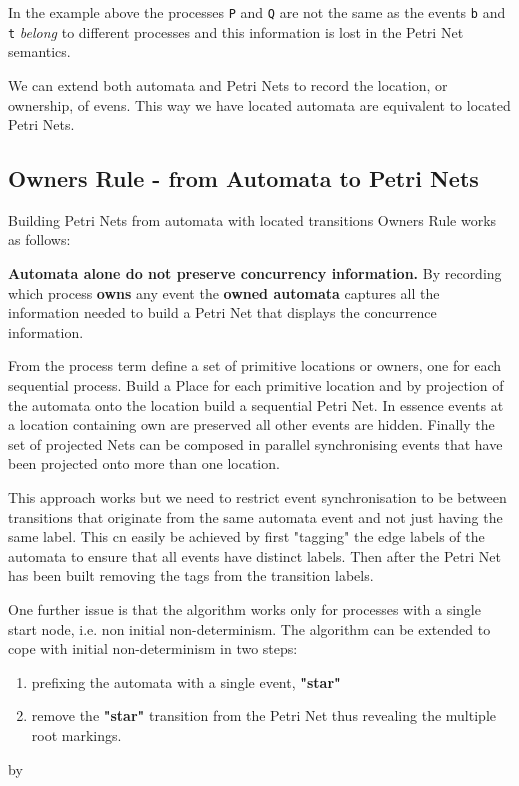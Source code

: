 \documentclass[]{article}
\begin{document}
In the example above the processes \verb|P| and \verb|Q| are not the same as the events \verb|b| and \verb|t| \emph{belong} to different processes and this information is lost in the Petri Net semantics.

We can extend both automata and Petri Nets to record the location, or ownership, of evens.  This way we have located automata are equivalent to located Petri Nets.

\subsection{Owners Rule - from Automata to Petri Nets}
Building Petri Nets from automata with located transitions {\sf Owners Rule} works as follows:




{\bf Automata alone do not preserve concurrency information.}  By recording which process {\bf owns} any event the {\bf owned automata} captures all the information needed to build a Petri Net that displays the concurrence information. 


 From the process term define a set of primitive locations or owners, one for each sequential process.  Build a Place for each primitive location and by projection of  the automata onto the location build a sequential Petri Net. In essence events at a location containing {\sf own} are preserved all other events are hidden. Finally the set of projected Nets can be composed in parallel synchronising  events that have been projected onto more than one location. 
 
 This approach works but we need to restrict event synchronisation to be between transitions that originate from the same automata event and not just having the same label.  This cn easily be achieved by first "tagging" the edge labels of the automata to ensure that all events have distinct labels. Then after the Petri Net has been built removing the tags from the transition labels.
 
 One further issue is that the algorithm works only for processes with a single start node, i.e. non initial non-determinism. The algorithm can be extended to cope with initial non-determinism  in two steps:
 
 \begin{enumerate}
 \item prefixing the automata with a single event, {\bf "star"}
 \item remove the  {\bf "star"} transition from the Petri Net thus revealing the multiple root markings.
 \end{enumerate}by 
 
\end{document}
